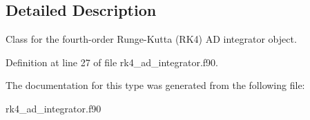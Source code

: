 \subsection{Detailed Description}
Class for the fourth-\/order Runge-\/\+Kutta (R\+K4) AD integrator object. 

Definition at line 27 of file rk4\+\_\+ad\+\_\+integrator.\+f90.



The documentation for this type was generated from the following file\+:\begin{DoxyCompactItemize}
\item 
rk4\+\_\+ad\+\_\+integrator.\+f90\end{DoxyCompactItemize}
